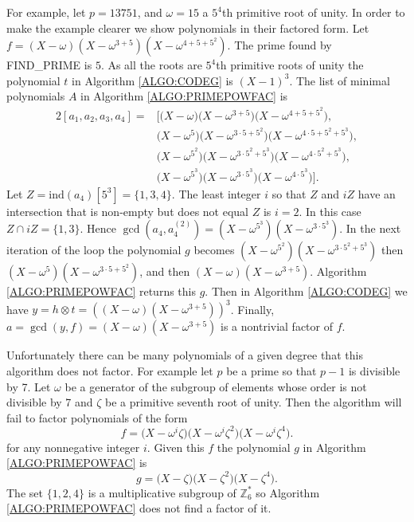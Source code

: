 \documentclass{article}
\theoremstyle{plain}
\theoremstyle{definition}
\def\ind {{ \mathrm{ind} }}
\begin{document}
		For example, let $p = 13751$, and $\omega = 15$ a $5^4$th primitive root of unity. In order to make the example clearer we show polynomials in their factored form. Let $f=(X-\omega)(X-{\omega}^{3+5})(X-{\omega}^{4+5+5^2})$. The prime found by FIND\_PRIME is $5$. As all the roots are $5^4$th primitive roots of unity the polynomial $t$ in Algorithm \ref{ALGO:CODEG} is $(X-1)^3$. The list of minimal polynomials $A$ in Algorithm \ref{ALGO:PRIMEPOWFAC} is 
		\begin{alignat*}{2}
		     [a_1,a_2,a_3,a_4] = &\bigl[\bigl(X-\omega    \bigr)\bigl(X-{\omega}^{3+5} \bigr)\bigl( X-{\omega}^{4+5+5^2} \bigr),                  \\
		                         &\bigl(X-\omega^{5}  \bigr)\bigl(X-{\omega}^{3\cdot 5+5^2}\bigr)\bigl(X-{\omega}^{4\cdot 5+5^2+5^3}\bigr),    \\
		                         &\bigl(X-\omega^{5^2}\bigr)\bigl(X-{\omega}^{3\cdot 5^2+5^3}\bigr)\bigl(X-{\omega}^{4\cdot 5^2+5^3}\bigr),    \\
		                         &\bigl(X-\omega^{5^3}\bigr)\bigl(X-{\omega}^{3\cdot 5^3}\bigr)\bigl(X-{\omega}^{4\cdot 5^3}\bigr) \bigr]. 
		\end{alignat*}	
		Let $Z=\ind(a_4)[5^3]=\{1,3,4\}$. The least integer $i$ so that $Z$ and $iZ$ have an intersection that is non-empty but does not equal $Z$ is $i=2$. In this case $Z \cap iZ=\{ 1,3 \}$. Hence $\gcd(a_4,a_4^{(2)})=(X-\omega^{5^3})(X-{\omega}^{3\cdot 5^3})$. In the next iteration of the loop the polynomial $g$ becomes $(X-\omega^{5^2})(X-{\omega}^{3\cdot 5^2+5^3})$ then $(X-\omega^{5})(X-{\omega}^{3\cdot 5+5^2})$, and then $(X-\omega)(X-{\omega}^{3+5})$. Algorithm \ref{ALGO:PRIMEPOWFAC} returns this $g$. 
		Then in Algorithm \ref{ALGO:CODEG} we have $y=h \otimes t=((X-\omega)(X-{\omega}^{3+5}))^3$. Finally, $a=\gcd(y,f)=(X-\omega)(X-{\omega}^{3+5})$ is a nontrivial factor of $f$. 
		
		Unfortunately there can be many polynomials of a given degree that this algorithm does not factor. For example let $p$ be a prime so that $p-1$ is divisible by 7. Let $\omega$ be a generator of the subgroup of elements whose order is not divisible by 7 and $\zeta$ be a primitive seventh root of unity. Then the algorithm will fail to factor polynomials of the form
		\[ f=\bigl(X-\omega^i \zeta \bigr)\bigl(X-\omega^i \zeta^2 \bigr)\bigl(X-\omega^i \zeta^4 \bigr). \]
		\noindent for any nonnegative integer $i$. Given this $f$ the polynomial $g$ in Algorithm \ref{ALGO:PRIMEPOWFAC} is 
		\[ g=\bigl(X-\zeta \bigr)\bigl(X-\zeta^2 \bigr)\bigl(X-\zeta^4 \bigr). \]
		The set $\{1,2,4 \}$ is a multiplicative subgroup of $\mathbb{Z}^{*}_6$ so Algorithm \ref{ALGO:PRIMEPOWFAC} does not find a factor of it. 
		
\end{document}
